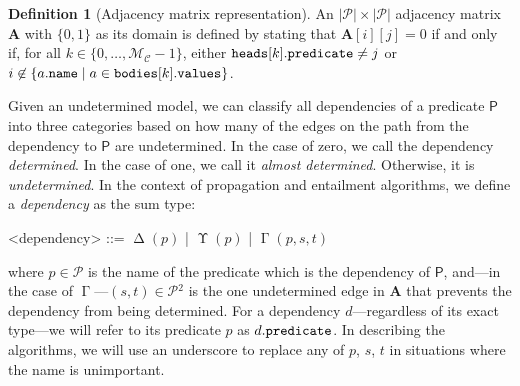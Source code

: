 \documentclass[letterpaper]{article}
\theoremstyle{definition}
\newtheorem{definition}{Definition}
\newcommand{\variable}[1]{\texttt{\textup{#1}}}
\newcommand{\predicates}{\mathcal{P}}
\newcommand{\maxNumClauses}{\mathcal{M}_{\mathcal{C}}}
\DeclareMathOperator{\Determined}{\Delta}
\DeclareMathOperator{\Undetermined}{\Upsilon}
\DeclareMathOperator{\AlmostDetermined}{\Gamma}
\begin{document}
\begin{definition}[Adjacency matrix representation] \label{def:adjacency_matrix}
  An $|\predicates{}| \times |\predicates{}|$ adjacency matrix $\mathbf{A}$ with
  $\{ 0, 1 \}$ as its domain is defined by stating that $\mathbf{A}[i][j] = 0$
  if and only if, for all $k \in \{ 0, \dots, \maxNumClauses{} - 1 \}$, either
$\variable{heads}[k].\variable{predicate} \ne j$ or $i \not\in \{
a.\variable{name} \mid a \in \variable{bodies}[k].\variable{values} \}$.
\end{definition}

Given an undetermined model, we can classify all dependencies of a predicate
$\mathsf{P}$ into three categories based on how many of the edges on the path
from the dependency to $\mathsf{P}$ are undetermined. In the case of zero, we
call the dependency \emph{determined}. In the case of one, we call it
\emph{almost determined}. Otherwise, it is \emph{undetermined}. In the context
of propagation and entailment algorithms, we define a \emph{dependency} as the
sum type:
\begin{grammar}
  <dependency> ::= $\Determined(p)$ | $\Undetermined(p)$ | $\AlmostDetermined(p,
  s, t)$
\end{grammar}
where $p \in \predicates{}$ is the name of the predicate which is the
dependency of $\mathsf{P}$, and---in the case of $\AlmostDetermined$---$(s, t)
\in \predicates{}^2$ is the one undetermined edge in $\mathbf{A}$ that prevents
the dependency from being determined. For a dependency $d$---regardless of its
exact type---we will refer to its predicate $p$ as $d.\variable{predicate}$. In
describing the algorithms, we will use an underscore to replace any of $p$, $s$,
$t$ in situations where the name is unimportant.
\end{document}
